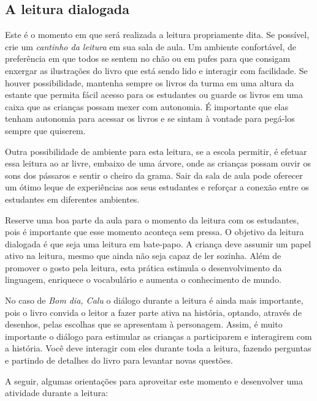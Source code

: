 \documentclass[11pt]{extarticle}
\begin{document}
\subsection{A leitura dialogada}
Este é o momento em que será realizada a leitura propriamente dita. 
Se possível, crie um \textit{cantinho da leitura} em sua sala de aula. Um 
ambiente confortável, de preferência em que todos se sentem no chão ou 
em pufes para que consigam enxergar as ilustrações do livro que está 
sendo lido e interagir com facilidade. Se houver possibilidade, mantenha 
sempre os livros da turma em uma altura da estante que permita fácil 
acesso para os estudantes ou guarde os livros em uma caixa que as crianças 
possam mexer com autonomia. É importante que elas tenham autonomia para 
acessar os livros e se sintam à vontade para pegá-los sempre que quiserem. 


Outra possibilidade de ambiente para esta leitura, se a escola permitir, 
é efetuar essa leitura ao ar livre, embaixo de uma árvore, onde as crianças 
possam ouvir os sons dos pássaros e sentir o cheiro da grama. Sair da sala 
de aula pode oferecer um ótimo leque de experiências aos seus estudantes e 
reforçar a conexão entre os estudantes em diferentes ambientes.  

Reserve uma boa parte da aula para o momento da leitura com os estudantes, 
pois é importante que esse momento aconteça sem pressa. O objetivo da 
leitura dialogada é que seja uma leitura em bate-papo. A criança deve 
assumir um papel ativo na leitura, mesmo que ainda não seja capaz de 
ler sozinha. Além de promover o gosto pela leitura, esta prática estimula 
o desenvolvimento da linguagem, enriquece o vocabulário e 
aumenta o conhecimento de mundo.

No caso de \textit{Bom dia, Calu} o diálogo durante a leitura é 
ainda mais importante, pois o livro convida o leitor a fazer parte ativa na história, optando, através de desenhos, pelas escolhas que se apresentam à personagem. Assim, é muito importante o diálogo para estimular as crianças a participarem e interagirem com a história.
Você deve interagir com eles durante toda a 
leitura, fazendo perguntas e partindo de detalhes do livro para 
levantar novas questões. 

A seguir, algumas orientações para aproveitar este momento e desenvolver uma atividade durante a leitura: 
\end{document}
